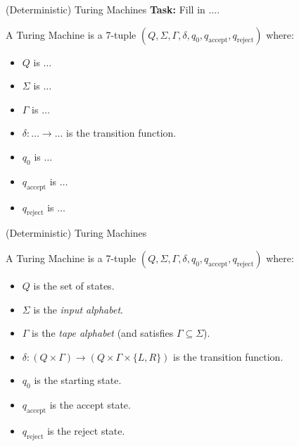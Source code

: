 \documentclass{beamer}
\begin{document}
\begin{frame}{(Deterministic) Turing Machines}
\textbf{Task:} Fill in $\ldots$. \\

\vspace{2mm}

A Turing Machine is a 7-tuple $(Q, \Sigma, \Gamma, \delta, q_0, q_{\text{accept}}, q_{\text{reject}})$ where:
\begin{itemize}
    \item $Q$ is $\ldots$
    \item $\Sigma$ is $\ldots$
    \item $\Gamma$ is $\ldots$
    \item $\delta: \ldots \to \ldots$ is the transition function.
    \item $q_0$ is $\ldots$
    \item $q_{\text{accept}}$ is $\ldots$
    \item $q_{\text{reject}}$ is $\ldots$
\end{itemize}
\end{frame}

\begin{frame}{(Deterministic) Turing Machines}

A Turing Machine is a 7-tuple $(Q, \Sigma, \Gamma, \delta, q_0, q_{\text{accept}}, q_{\text{reject}})$ where:
\begin{itemize}
    \item $Q$ is the set of states.
    \item $\Sigma$ is the \textit{input alphabet}.
    \item $\Gamma$ is the \textit{tape alphabet} (and satisfies $\Gamma \subseteq \Sigma$).
    \item $\delta: (Q \times \Gamma) \to (Q \times \Gamma \times \{L, R\})$ is the transition function.
    \item $q_0$ is the starting state.
    \item $q_{\text{accept}}$ is the accept state.
    \item $q_{\text{reject}}$ is the reject state.
\end{itemize}
\end{frame}
\end{document}
